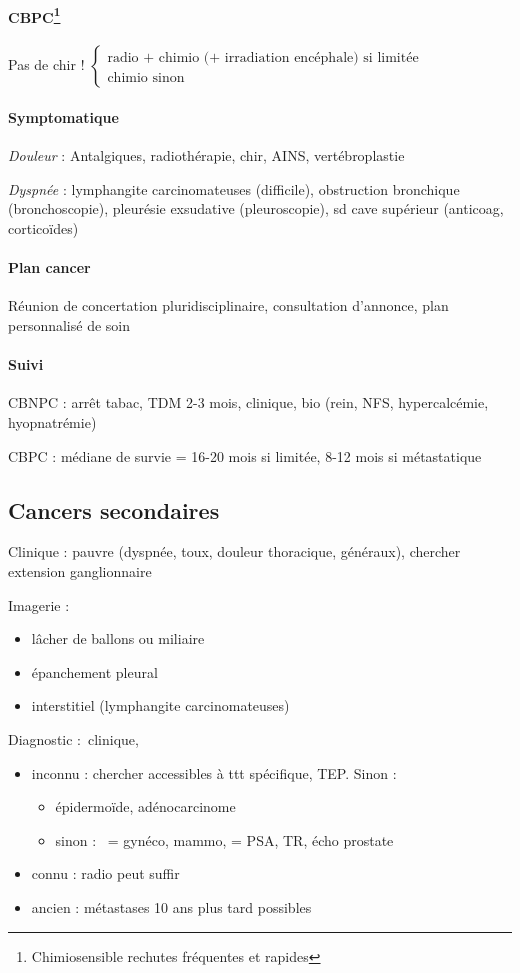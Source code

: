 \paragraph{CBPC\footnote{Chimiosensible rechutes fréquentes et rapides}}
Pas de chir !
$
\left \{
  \begin{array}{l}
    \text{radio + chimio (+ irradiation encéphale) si limitée}\\
    \text{chimio sinon}
  \end{array}
\right.
$

\paragraph{Symptomatique}
\textit{Douleur}  : Antalgiques, radiothérapie, chir, AINS, vertébroplastie

\textit{Dyspnée}  : lymphangite carcinomateuses (difficile), obstruction bronchique
(bronchoscopie), pleurésie exsudative (pleuroscopie), sd cave supérieur
(anticoag, corticoïdes)

\paragraph{Plan cancer}
Réunion de concertation pluridisciplinaire, consultation d'annonce, plan
personnalisé de soin
\paragraph{Suivi}
CBNPC : arrêt tabac, TDM 2-3 mois, clinique, bio (rein, NFS, hypercalcémie,
hyopnatrémie)

CBPC : médiane de survie = 16-20 mois si limitée, 8-12 mois si métastatique
\subsection{Cancers secondaires}
Clinique : pauvre (dyspnée, toux, douleur thoracique, généraux), chercher extension ganglionnaire

Imagerie : 
\begin{itemize}
\item lâcher de ballons ou miliaire
\item épanchement pleural
\item interstitiel (lymphangite carcinomateuses)
\end{itemize}

Diagnostic : clinique, 
\begin{itemize}
\item inconnu : chercher accessibles à ttt spécifique, TEP. Sinon :
  \begin{itemize}
  \item épidermoïde, adénocarcinome
  \item sinon : \female{} = {gynéco, mammo}, \male{} = {PSA, TR, écho prostate}
  \end{itemize}
\item connu : radio peut suffir
\item ancien : métastases 10 ans plus tard possibles
\end{itemize}

